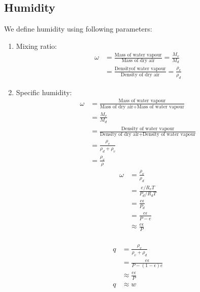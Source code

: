 \documentclass[fleqn,10pt]{SelfArx} %
\begin{document}
\subsection{Humidity}
We define humidity using following parameters:
\begin{enumerate}
    \item Mixing ratio:
        \begin{align}
            \omega &= \frac{ \text{Mass of water vapour}}{\text{Mass of dry air}} = \frac{M_v}{M_d} \\
                   &=\frac{ \text{Densityof water vapour}}{\text{Density of dry air}}= \frac{\rho_v}{\rho_d}
            \label{eq:mixingratio}
        \end{align}
    \item Specific humidity:
        \begin{align}
            \omega &= \frac{ \text{Mass of water vapour}}{\text{Mass of dry air} + \text{Mass of water vapour}} \\
              &= \frac{M_v}{M_d} \\
              &= \frac{ \text{Density of water vapour}}{\text{Density of dry air} + \text{Density of water vapour}} \\
              &= \frac{\rho_v}{\rho_d+\rho_v} \\
              &= \frac{\rho_v}{\rho}
            \label{Specificheat}
        \end{align}
        \begin{align}
            \omega &= \frac{\rho_v}{\rho_d} \\
                &= \frac{e/R_v T}{P_d/R_d T} \\
                &= \frac{e\epsilon}{P_d} \\ 
                &= \frac{e\epsilon}{P-e} \\
                &\approx \frac{e\epsilon}{P}
        \end{align}
         \\
    \begin{align*}
        q &= \frac{\rho_v}{\rho_v + \rho_d} \\
          &= \frac{e\epsilon}{P-(1-\epsilon)e} \\
          &\approx \frac{e\epsilon}{P} \\ 
        q &\approx w   
    \end{align*}
\end{enumerate}
\end{document}
